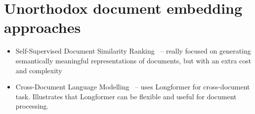 \section{Unorthodox document embedding approaches}

\begin{itemize}

    \item Self-Supervised Document Similarity Ranking~\citep{ginzburg2021self} --
    really focused on generating semantically meaningful representations of
    documents, but with an extra cost and complexity


    \item Cross-Document Language Modelling~\citep{caciularu2021cdlm} -- uses
    Longformer for cross-document task. Illustrates that Longformer can be
    flexible and useful for document processing.

\end{itemize}
